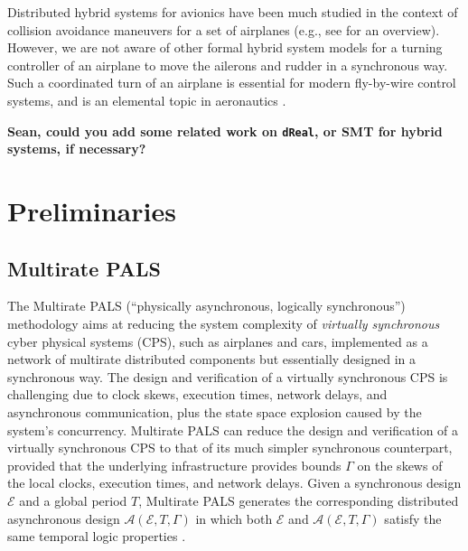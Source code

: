 \documentclass{sig-alternate}
\begin{document}
Distributed hybrid systems for avionics have been much studied
in the context of collision avoidance maneuvers for a set of airplanes
(e.g., see \cite{loos-hscc13} for an overview).
However, we are not aware of other formal hybrid system models 
for a turning controller of an airplane to move the ailerons and rudder
in a synchronous way.
Such a coordinated turn of an airplane 
is essential for modern fly-by-wire control systems,
and is an elemental topic in aeronautics \cite{anderson2005introduction}.



\textbf{Sean, could you add some related work on \texttt{dReal}, or SMT for hybrid systems,
if necessary?}








\section{Preliminaries}

\subsection{Multirate PALS} 

The Multirate PALS (``physically asynchronous,  logically synchronous'') 
methodology \cite{pals-rtss09,mr-pals-journal,pals-tcs}
aims at reducing the system complexity 
of \emph{virtually synchronous}  cyber physical systems (CPS),
such as airplanes and cars,
implemented as a network of multirate distributed components but essentially designed in a synchronous way.
%
The design and verification of a virtually synchronous CPS
is challenging  due to
clock skews,
execution times, 
network delays, and asynchronous communication,
plus the state space explosion caused by the system's concurrency. 
%
Multirate PALS can reduce
the design and verification of a virtually synchronous CPS to
that of its much simpler synchronous counterpart,
provided that the underlying infrastructure provides bounds $\Gamma$
on the skews of the local clocks, 
execution times,  and network delays. 
%
Given a synchronous design $\mathcal{E}$ and a global period $T$,
Multirate PALS generates
the corresponding distributed asynchronous 
design $\mathcal{A}(\mathcal{E}, T, \Gamma)$
in which both $\mathcal{E}$ and $\mathcal{A}(\mathcal{E}, T, \Gamma)$
satisfy the same temporal logic properties \cite{mr-pals-journal,pals-tcs}.
%
\end{document}
